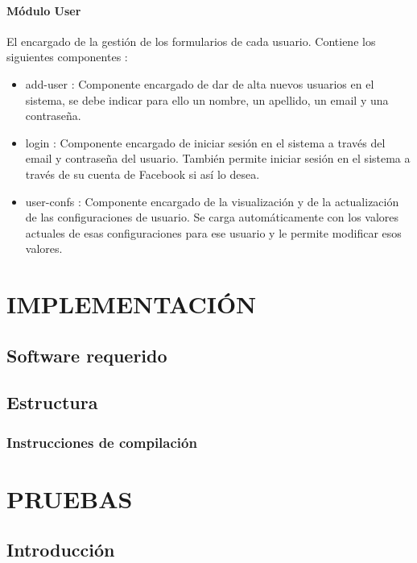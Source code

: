 \documentclass[12pt, a4paper, twoside]{book}
\begin{document}
	\subsubsection{Módulo User}
	El encargado de la gestión de los formularios de cada usuario. Contiene los siguientes componentes : 
	\begin{itemize}
		\item add-user : Componente encargado de dar de alta nuevos usuarios en el sistema, se debe indicar para ello un nombre, un apellido, un email y una contraseña.
		\item login : Componente encargado de iniciar sesión en el sistema a través del email y contraseña del usuario. También permite iniciar sesión en el sistema a través de su cuenta de Facebook si así lo desea.
		\item user-confs : Componente encargado de la visualización y de la actualización de las configuraciones de usuario. Se carga automáticamente con los valores actuales de esas configuraciones para ese usuario y le permite modificar esos valores.
	\end{itemize}
	
	\chapter{IMPLEMENTACIÓN}
	\section{Software requerido}

	\section{Estructura}
	
	\subsection{Instrucciones de compilación}
	
	\chapter{PRUEBAS}
	\section{Introducción}
	
\end{document}
